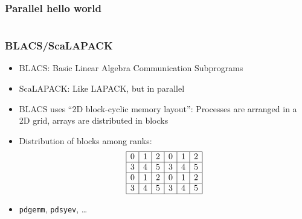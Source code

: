 \documentclass[usenames,dvipsnames,mathserif,compress]{beamer}
\begin{document}
\begin{frame}[fragile]
  \frametitle{Parallel hello world}
  
\end{frame}

\begin{frame}[fragile]
  \begin{columns}
    \begin{column}{1.05\textwidth}
  
    \end{column}
  \end{columns}
\end{frame}


\begin{frame}
  \frametitle{BLACS/ScaLAPACK}
  \begin{itemize}
  \item BLACS: Basic Linear Algebra Communication Subprograms
  \item ScaLAPACK: Like LAPACK, but in parallel
  \item BLACS uses ``2D block-cyclic memory layout'': Processes are arranged in a 2D grid, arrays are distributed in blocks
  \item Distribution of blocks among ranks:
    \begin{align}
      \begin{array}{|c|c|c|c|c|c|}
        \hline
          0 & 1 & 2 & 0 & 1 & 2\\\hline
          3 & 4 & 5 & 3 & 4 & 5\\\hline
          0 & 1 & 2 & 0 & 1 & 2\\\hline
          3 & 4 & 5 & 3 & 4 & 5\\\hline
        \end{array}\nonumber
    \end{align}
  \item \texttt{pdgemm}, \texttt{pdsyev}, \ldots
  \end{itemize}
\end{frame}
\end{document}
